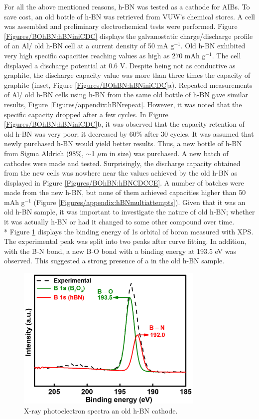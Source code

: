 For all the above mentioned reasons, h-BN was tested as a cathode for AIBs. To save cost, an old bottle of h-BN was retrieved from VUW's chemical stores. A cell was assembled and preliminary electrochemical tests were performed. Figure \ref{Figures/BOhBN:hBNiniCDC} displays the galvanostatic charge/discharge profile of an Al/ old h-BN cell at a current density of 50 mA g$^{-1}$. Old h-BN exhibited very high specific capacities reaching values as high as 270 mAh g$^{-1}$. The cell displayed a discharge potential at 0.6 V. Despite being not as conductive as graphite, the discharge capacity value was more than three times the capacity of graphite (inset, Figure \ref{Figures/BOhBN:hBNiniCDC}a). Repeated measurements of Al/ old h-BN cells using h-BN from the same old bottle of h-BN gave similar results, Figure \ref{Figures/appendix:hBNrepeat}. However, it was noted that the specific capacity dropped after a few cycles. In Figure \ref{Figures/BOhBN:hBNiniCDC}b, it was observed that the capacity retention of old h-BN was very poor; it decreased by 60\% after 30 cycles. It was assumed that newly purchased h-BN would yield better results. Thus, a new bottle of h-BN from Sigma Aldrich (98\%, $\sim$1 $\mu$m in size) was purchased. A new batch of cathodes were made and tested. Surprisingly, the discharge capacity obtained from the new cells was nowhere near the values achieved by the old h-BN as displayed in Figure \ref{Figures/BOhBN:hBNCDCCE}. A number of batches were made from the new h-BN, but none of them achieved capacities higher than 50 mAh g$^{-1}$ (Figure \ref{Figures/appendix:hBNmultiattempts}). Given that it was an old h-BN sample, it was important to investigate the nature of old h-BN; whether it was actually h-BN or had it changed to some other compound over time.\\*
Figure \ref{Figures/BOhBN:oldxps} displays the binding energy of 1s orbital of boron measured with XPS. The experimental peak was split into two peaks after curve fitting. In addition, with the B-N bond, a new B-O bond with a binding energy at 193.5 eV was observed. This suggested a strong presence of a  in the old h-BN sample.

\begin{figure}[tbh!]
\centering
\includegraphics[width=0.8\textwidth]{Figures/BOhBN/oldxps}
\caption{X-ray photoelectron spectra an old h-BN cathode.}
\label{Figures/BOhBN:oldxps}
\end{figure}

